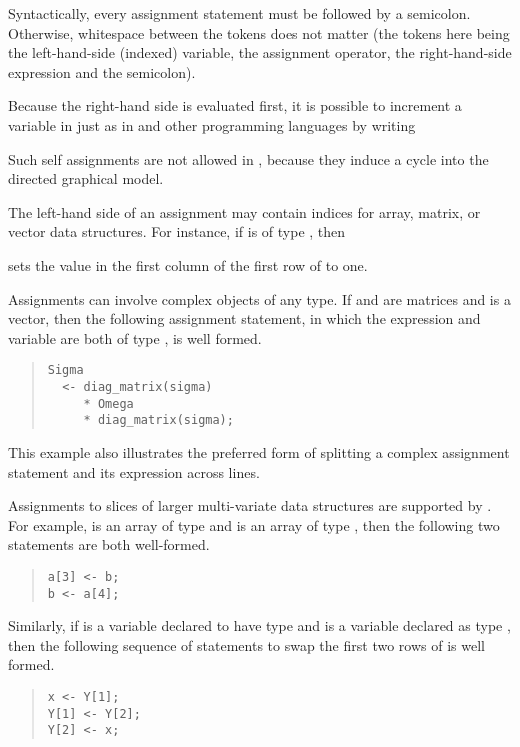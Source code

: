 Syntactically, every assignment statement must be followed by a
semicolon.  Otherwise, whitespace between the tokens does not matter
(the tokens here being the left-hand-side (indexed) variable, the
assignment operator, the right-hand-side expression and the
semicolon).

Because the right-hand side is evaluated first, it is possible to
increment a variable in \Stan just as in \Cpp and other programming
languages by writing
%
\begin{quote}
\end{quote}
%
Such self assignments are not allowed in \BUGS, because they induce a
cycle into the directed graphical model.

The left-hand side of an assignment may contain indices for array, matrix, or vector
data structures.  For instance, if  is of type
, then 
%
\begin{quote}
\end{quote}
%
sets the value in the first column of the first row of  to one.

Assignments can involve complex objects of any type.  If 
and  are matrices and  is a vector, then the
following assignment statement, in which the expression and variable
are both of type , is well formed.
%
\begin{quote}
\begin{Verbatim}[fontsize=\small]
Sigma
  <- diag_matrix(sigma)
     * Omega 
     * diag_matrix(sigma);
\end{Verbatim}
\end{quote}
%
This example also illustrates the preferred form of splitting a
complex assignment statement and its expression across lines.

Assignments to slices of larger multi-variate data structures are
supported by \Stan.  For example,  is an array of type
 and  is an array of type , then
the following two statements are both well-formed.
%
\begin{quote}
\begin{Verbatim}[fontsize=\small]
a[3] <- b;
b <- a[4];
\end{Verbatim}
\end{quote}
%
Similarly, if  is a variable declared to have type
 and  is a variable declared as type
, then the following sequence of statements to swap the
first two rows of  is well formed.
%
\begin{quote}
\begin{Verbatim}[fontsize=\small]
x <- Y[1];
Y[1] <- Y[2];
Y[2] <- x;
\end{Verbatim}
\end{quote}
%

